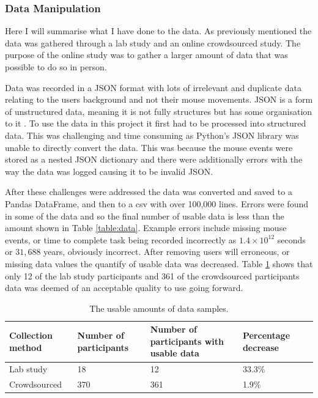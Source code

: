 \documentclass{article}
\begin{document}
\subsubsection{Data Manipulation}

Here I will summarise what I have done to the data.
As previously mentioned the data was gathered through a lab study and an online crowdsourced study.
The purpose of the online study was to gather a larger amount of data that was possible to do so in person.

Data was recorded in a JSON format with lots of irrelevant and duplicate data relating to the users background and not their mouse movements.
JSON is a form of unstructured data, meaning it is not fully structures but has some organisation to it \cite{ronk2014structured}.
To use the data in this project it first had to be processed into structured data.
This was challenging and time consuming as Python's JSON library was unable to directly convert the data.
This was because the mouse events were stored as a nested JSON dictionary and there were additionally errors with the way the data was logged causing it to be invalid JSON.

After these challenges were addressed the data was converted and saved to a Pandas DataFrame, and then to a csv with over 100,000 lines.
Errors were found in some of the data and so the final number of usable data is less than the amount shown in Table \ref{table:data}.
Example errors include missing mouse events, or time to complete task being recorded incorrectly as 
$1.4 \times 10^{12}$ seconds or $31,688$ years, obviously incorrect.
After removing users will erroneous, or missing data values the quantify of usable data was decreased.
Table \ref{table:UseableData} shows that only 12 of the lab study participants and 361 of the crowdsourced participants data was deemed of an acceptable quality to use going forward.

\begin{table}[ht]
    \caption{\label{table:UseableData} The usable amounts of data samples.}
    \small
    \begin{tabular}{llp{2.3cm}ll}
        \hline
        Collection method   & Number of participants & Number of participants with usable data  & Percentage decrease \\  \hline
        Lab study           & 18                        & 12                                    & 33.3\%  \\
        Crowdsourced        & 370                       & 361                                   & 1.9\%  \\  \hline
    \end{tabular}
\end{table}
\end{document}

